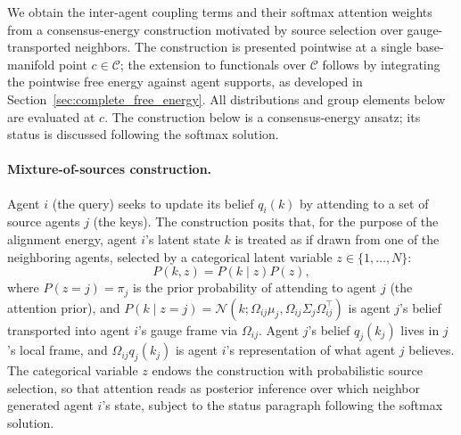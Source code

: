\documentclass[11pt]{article}
\begin{document}
We obtain the inter-agent coupling terms and their softmax attention weights from a consensus-energy construction motivated by source selection over gauge-transported neighbors. The construction is presented pointwise at a single base-manifold point $c \in \mathcal{C}$; the extension to functionals over $\mathcal{C}$ follows by integrating the pointwise free energy against agent supports, as developed in Section~\ref{sec:complete_free_energy}. All distributions and group elements below are evaluated at $c$. The construction below is a consensus-energy ansatz; its status is discussed following the softmax solution.

\paragraph{Mixture-of-sources construction.}
Agent $i$ (the query) seeks to update its belief $q_i(k)$ by attending to a set of source agents $j$ (the keys). The construction posits that, for the purpose of the alignment energy, agent $i$'s latent state $k$ is treated as if drawn from one of the neighboring agents, selected by a categorical latent variable $z \in \{1, \ldots, N\}$:
\begin{equation}
P(k, z) = P(k \mid z) P(z),
\label{eq:mixture_joint}
\end{equation}
where $P(z = j) = \pi_j$ is the prior probability of attending to agent $j$ (the attention prior), and $P(k \mid z = j) = \mathcal{N}(k; \Omega_{ij}\mu_j, \Omega_{ij}\Sigma_j\Omega_{ij}^\top)$ is agent $j$'s belief transported into agent $i$'s gauge frame via $\Omega_{ij}$. Agent $j$'s belief $q_j(k_j)$ lives in $j$'s local frame, and $\Omega_{ij}q_j(k_j)$ is agent $i$'s representation of what agent $j$ believes. The categorical variable $z$ endows the construction with probabilistic source selection, so that attention reads as posterior inference over which neighbor generated agent $i$'s state, subject to the status paragraph following the softmax solution.
\end{document}
